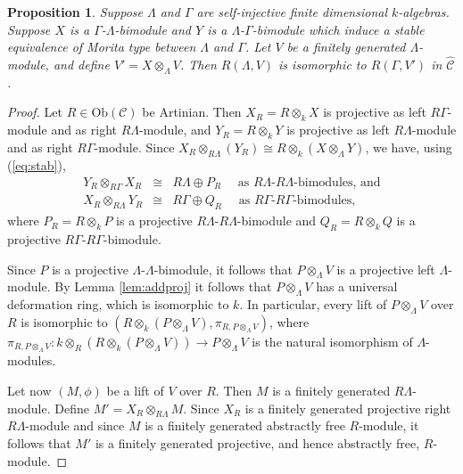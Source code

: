 \documentclass{amsart}
\theoremstyle{plain}
\newtheorem{prop}[thm]{Proposition}
\theoremstyle{definition}
\theoremstyle{remark}
\begin{document}
\begin{prop}
\label{prop:stabmordef}
Suppose $\Lambda$ and $\Gamma$ are self-injective finite dimensional $k$-algebras.
Suppose $X$ is a $\Gamma$-$\Lambda$-bimodule and $Y$ is a $\Lambda$-$\Gamma$-bimodule
which induce a stable equivalence of Morita type between $\Lambda$ and $\Gamma$. Let $V$ be a 
finitely generated $\Lambda$-module, and define $V'=X\otimes_{\Lambda}V$. Then 
$R(\Lambda,V)$ is isomorphic to $R(\Gamma,V')$ in $\hat{\mathcal{C}}$.
\end{prop}

\begin{proof}
Let $R\in\mathrm{Ob}(\mathcal{C})$ be Artinian. Then $X_R=R\otimes_kX$ is projective as left 
$R\Gamma$-module and as right $R\Lambda$-module, and $Y_R=R\otimes_k Y$ is projective as left 
$R\Lambda$-module and as right $R\Gamma$-module.
Since $X_R\otimes_{R\Lambda} (Y_R) \cong R\otimes_k(X\otimes_\Lambda Y)$, we have, using 
(\ref{eq:stab}),
\begin{eqnarray*}
Y_R\otimes_{R\Gamma} X_R&\cong& R\Lambda \oplus P_R \quad\mbox{ as 
$R\Lambda$-$R\Lambda$-bimodules, and}\\
X_R\otimes_{R\Lambda} Y_R&\cong &R\Gamma\oplus Q_R \quad\mbox{ as 
$R\Gamma$-$R\Gamma$-bimodules},
\end{eqnarray*}
where $P_R=R\otimes_k P$ is a projective $R\Lambda$-$R\Lambda$-bimodule and
$Q_R=R\otimes_k Q$ is a projective $R\Gamma$-$R\Gamma$-bimodule.

Since $P$  is a projective $\Lambda$-$\Lambda$-bimodule, it follows that $P\otimes_\Lambda V$
is a projective left $\Lambda$-module. By Lemma \ref{lem:addproj} it follows that 
$P\otimes_\Lambda V$ has a universal deformation ring, which is isomorphic to $k$.
In particular, every lift of $P\otimes_\Lambda V$ over $R$ is isomorphic to 
$\left(R\otimes_k (P\otimes_\Lambda V), \pi_{R,P\otimes_\Lambda V}\right)$, where
$\pi_{R,P\otimes_\Lambda V}:k\otimes_R \left(R\otimes_k (P\otimes_\Lambda V)\right)
\to P\otimes_\Lambda V$ is the natural isomorphism of $\Lambda$-modules.

Let now $(M,\phi)$ be a lift of $V$ over $R$. Then $M$ is a finitely generated $R\Lambda$-module.
Define $M'=X_R\otimes_{R\Lambda}M$.
Since $X_R$ is a finitely generated projective right $R\Lambda$-module and since $M$ is a finitely 
generated abstractly free $R$-module, it follows that $M'$ is a finitely generated projective, 
and hence abstractly free, $R$-module. 


\end{proof}
\end{document}
